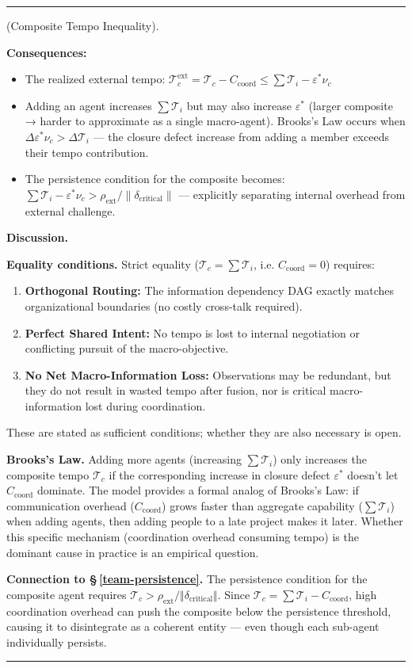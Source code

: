 \documentclass[11pt,oneside]{article}
\newcounter{claim}[section]
\renewcommand{\theclaim}{\thesection.\arabic{claim}}
\newenvironment{segment}[2]{%
  \refstepcounter{claim}%
  \bigskip\noindent\hrule\smallskip
  \noindent{\bfseries #1~\theclaim}\enskip(#2).\par\smallskip
  \noindent\ignorespaces
}{%
  \par\smallskip\noindent\hrule\bigskip
}
\newenvironment{sketch}[1][]{\begin{segment}{Sketch}{#1}}{\end{segment}}
\begin{document}
\begin{sketch}[Composite Tempo Inequality]
\textbf{Consequences:}
\begin{itemize}
  \item The realized external tempo: $\mathcal T_c^{\text{ext}} = \mathcal T_c - C_{\text{coord}} \leq \sum \mathcal T_i - \varepsilon^* \nu_c$
  \item Adding an agent increases $\sum \mathcal T_i$ but may also increase $\varepsilon^*$ (larger composite → harder to approximate as a single macro-agent). Brooks's Law occurs when $\Delta\varepsilon^* \nu_c > \Delta\mathcal T_i$ — the closure defect increase from adding a member exceeds their tempo contribution.
  \item The persistence condition for the composite becomes: $\sum \mathcal T_i - \varepsilon^* \nu_c > \rho_{\text{ext}} / \lVert\delta_{\text{critical}}\rVert$ — explicitly separating internal overhead from external challenge.
\end{itemize}



\medskip\noindent\textbf{Discussion.}


\textbf{Equality conditions.} Strict equality ($\mathcal T_c = \sum \mathcal T_i$, i.e. $C_{\text{coord}} = 0$) requires:
\begin{enumerate}
  \item \textbf{Orthogonal Routing:} The information dependency DAG exactly matches organizational boundaries (no costly cross-talk required).
  \item \textbf{Perfect Shared Intent:} No tempo is lost to internal negotiation or conflicting pursuit of the macro-objective.
  \item \textbf{No Net Macro-Information Loss:} Observations may be redundant, but they do not result in wasted tempo after fusion, nor is critical macro-information lost during coordination.
\end{enumerate}


These are stated as sufficient conditions; whether they are also necessary is open.

\textbf{Brooks's Law.} Adding more agents (increasing $\sum \mathcal T_i$) only increases the composite tempo $\mathcal T_c$ if the corresponding increase in closure defect $\varepsilon^*$ doesn't let $C_{\text{coord}}$ dominate. The model provides a formal analog of Brooks's Law: if communication overhead ($C_{\text{coord}}$) grows faster than aggregate capability ($\sum \mathcal T_i$) when adding agents, then adding people to a late project makes it later. Whether this specific mechanism (coordination overhead consuming tempo) is the dominant cause in practice is an empirical question.

\textbf{Connection to \S\,\ref{team-persistence}.} The persistence condition for the composite agent requires $\mathcal T_c > \rho_{\text{ext}} / \Vert\delta_{\text{critical}}\Vert$. Since $\mathcal T_c = \sum \mathcal T_i - C_{\text{coord}}$, high coordination overhead can push the composite below the persistence threshold, causing it to disintegrate as a coherent entity — even though each sub-agent individually persists.

\end{sketch}
\end{document}
